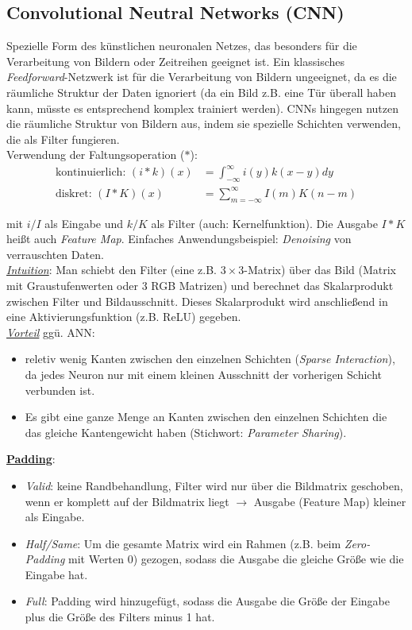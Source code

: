 \subsection{Convolutional Neutral Networks (CNN)}
\label{cnn}
Spezielle Form des künstlichen neuronalen Netzes, das besonders für die Verarbeitung von Bildern oder Zeitreihen geeignet ist.
Ein klassisches \emph{Feedforward}-Netzwerk ist für die Verarbeitung von Bildern ungeeignet, da es die räumliche Struktur der Daten ignoriert (da ein Bild z.B. eine Tür überall haben kann, müsste es entsprechend komplex trainiert werden).
CNNs hingegen nutzen die räumliche Struktur von Bildern aus, indem sie spezielle Schichten verwenden, die als Filter fungieren.\\

Verwendung der Faltungsoperation ($*$):
\begin{equation*}
    \begin{aligned}
        \text{kontinuierlich: }(i*k)(x) &= \int_{-\infty}^{\infty}i(y)k(x-y)dy\\
        \text{diskret: }(I*K)(x) &= \sum_{m=-\infty}^{\infty}I(m)K(n-m)
    \end{aligned}
\end{equation*}

mit $i/I$ als Eingabe und $k/K$ als Filter (auch: Kernelfunktion). Die Ausgabe $I*K$ heißt auch \emph{Feature Map}. Einfaches Anwendungsbeispiel:
\emph{Denoising} von verrauschten Daten.\\

\underline{\emph{Intuition}}: Man schiebt den Filter (eine z.B. $3\times 3$-Matrix) über das Bild (Matrix mit Graustufenwerten oder 3 RGB Matrizen) und berechnet das Skalarprodukt zwischen Filter und Bildausschnitt. Dieses Skalarprodukt wird anschließend in eine Aktivierungsfunktion (z.B. ReLU) gegeben.\\

\underline{\emph{Vorteil}} ggü. ANN: 
\begin{itemize}
    \item reletiv wenig Kanten zwischen den einzelnen Schichten (\emph{Sparse Interaction}), da jedes Neuron nur mit einem kleinen Ausschnitt der vorherigen Schicht verbunden ist.
    \item Es gibt eine ganze Menge an Kanten zwischen den einzelnen Schichten die das gleiche Kantengewicht haben (Stichwort: \emph{Parameter Sharing}).
\end{itemize}

\underline{\textbf{Padding}}:
\begin{itemize}
    \item \emph{Valid}: keine Randbehandlung, Filter wird nur über die Bildmatrix geschoben, wenn er komplett auf der Bildmatrix liegt $\rightarrow$ Ausgabe (Feature Map) kleiner als Eingabe.
    \item \emph{Half/Same}: Um die gesamte Matrix wird ein Rahmen (z.B. beim \emph{Zero-Padding} mit Werten $0$) gezogen, sodass die Ausgabe die gleiche Größe wie die Eingabe hat.
    \item \emph{Full}: Padding wird hinzugefügt, sodass die Ausgabe die Größe der Eingabe plus die Größe des Filters minus 1 hat.
\end{itemize}

